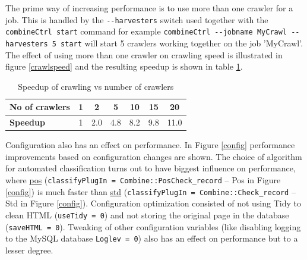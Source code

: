 The prime way of increasing performance is to use more than one
crawler for a job. This is handled by the \verb+--harvesters+ switch
used together with the {\tt combineCtrl start} command for example
\verb+combineCtrl --jobname MyCrawl --harvesters 5 start+
will start 5 crawlers working together on the job 'MyCrawl'. The
effect of using more than one crawler on crawling speed is illustrated
in figure \ref{crawlspeed} and the resulting speedup is shown in table \ref{speedup}.

\begin{table}[h]
\begin{center}
\begin{tabular}{|l|c|c|c|c|c|c|}
\hline
{\bf No of crawlers}& 1& 2& 5& 10& 15& 20\\ \hline
{\bf Speedup}& 1& 2.0& 4.8& 8.2& 9.8& 11.0\\ \hline
\end{tabular}
\end{center}
\caption{Speedup of crawling vs number of crawlers}
\label{speedup}
\end{table}

Configuration also has an effect on performance. In Figure
\ref{config} performance improvements based on configuration changes are shown. The choice of
algorithm for automated classification turns out to have biggest
influence on performance, where \hyperref{algorithm 2}{algorithm 2 -- section }{ --}{pos} ({\tt classifyPlugIn = Combine::PosCheck\_record} -- Pos in Figure \ref{config}) is much
faster than \hyperref{algorithm 1}{algorithm 1 -- section }{ --}{std} ({\tt classifyPlugIn = Combine::Check\_record} -- Std in Figure \ref{config}).
Configuration optimization consisted of not using
Tidy to clean HTML ({\tt useTidy = 0}) and not storing the original
page in the database ({\tt saveHTML = 0}).
 Tweaking of other configuration variables (like disabling logging
to the MySQL database {\tt Loglev = 0}) also has an effect
on performance but to a lesser degree.


